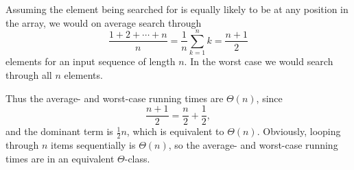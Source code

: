 Assuming the element being searched for is equally likely to be at
any position in
the array, we would on average search through
\[
  \frac{1 + 2 + \cdots + n}{n}  = \frac{1}{n}\sum_{k=1}^nk = \frac{n + 1}{2}
\]
elements for an input sequence of length $n$. In the worst case we
would search through
all $n$ elements.

Thus the average- and worst-case running times are $\Theta(n)$, since
\[
  \frac{n + 1}{2} = \frac{n}{2} + \frac{1}{2},
\]
and the dominant term is $\frac{1}{2}n$, which is equivalent to
$\Theta(n)$. Obviously,
looping through $n$ items sequentially is $\Theta(n)$, so the
average- and worst-case
running times are in an equivalent $\Theta$-class.
